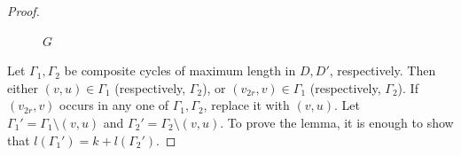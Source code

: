 \documentclass[a4paper, 10pt]{article}
\numberwithin{equation}{section}
\begin{document}
\begin{proof}
\begin{figure}[H]
		\caption{$G$}
	\end{figure}
	Let $\Gamma_1, \Gamma_2$ be composite cycles of maximum length in $D, D'$, respectively. Then either $(v,u) \in \Gamma_1$ (respectively, $\Gamma_2$), or $(v_{2r},v) \in \Gamma_1$ (respectively, $\Gamma_2$). If $(v_{2r},v)$ occurs in any one of $\Gamma_1, \Gamma_2$, replace it with $(v,u)$. Let $\Gamma_1'=\Gamma_1\setminus(v,u)$ and $\Gamma_2'=\Gamma_2\setminus(v,u)$. To prove the lemma, it is enough to show that $l(\Gamma_1')=k+l(\Gamma_2')$.  
	
	
	
	
	
	

\end{proof}
\end{document}

